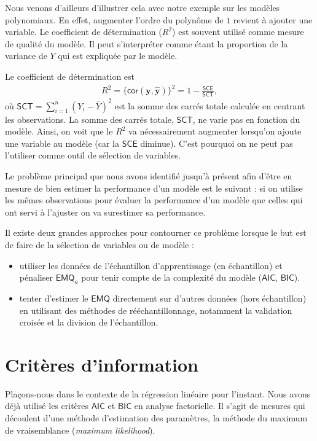 \documentclass[
]{book}
\providecommand{\tightlist}{%
  \setlength{\itemsep}{0pt}\setlength{\parskip}{0pt}}
\theoremstyle{definition}
\theoremstyle{definition}
\theoremstyle{definition}
\theoremstyle{remark}
\begin{document}
Nous venons d'ailleurs d'illustrer cela avec notre exemple sur les modèles polynomiaux. En effet, augmenter l'ordre du polynôme de \(1\) revient à ajouter une variable. Le coefficient de détermination (\(R^2\)) est souvent utilisé comme mesure de qualité du modèle. Il peut s'interpréter comme étant la proportion de la variance de \(Y\) qui est expliquée par le modèle.

Le coefficient de détermination est
\begin{align*}
R^2=\{\mathsf{cor}(\boldsymbol{y}, \widehat{\boldsymbol{y}})\}^2 = 1-\frac{\mathsf{SCE}}{\mathsf{SCT}},
\end{align*}
où \(\mathsf{SCT}=\sum_{i=1}^n (Y_i-\overline{Y})^2\) est la somme des carrés totale calculée en centrant les observations. La somme des carrés totale, \(\mathsf{SCT}\), ne varie pas en fonction du modèle.
Ainsi, on voit que le \(R^2\) va nécessairement augmenter lorsqu'on ajoute une variable au modèle (car la \(\mathsf{SCE}\) diminue). C'est pourquoi on ne peut pas l'utiliser comme outil de sélection de variables.

Le problème principal que nous avons identifié jusqu'à présent afin d'être en mesure de bien estimer la performance d'un modèle est le suivant : si on utilise les mêmes observations pour évaluer la performance d'un modèle que celles qui ont servi à l'ajuster on va surestimer sa performance.

Il existe deux grandes approches pour contourner ce problème lorsque le but est de faire de la sélection de variables ou de modèle :

\begin{itemize}
\tightlist
\item
  utiliser les données de l'échantillon d'apprentissage (en échantillon) et pénaliser \(\mathsf{EMQ}_a\) pour tenir compte de la complexité du modèle (\(\mathsf{AIC}\), \(\mathsf{BIC}\)).
\item
  tenter d'estimer le \(\mathsf{EMQ}\) directement sur d'autres données (hors échantillon) en utilisant des méthodes de rééchantillonnage, notamment la validation croisée et la division de l'échantillon.
\end{itemize}

\hypertarget{crituxe8res-dinformation}{%
\section{Critères d'information}\label{crituxe8res-dinformation}}

Plaçons-nous dans le contexte de la régression linéaire pour l'instant.
Nous avons déjà utilisé les critères \(\mathsf{AIC}\) et \(\mathsf{BIC}\) en analyse factorielle. Il s'agit de mesures qui découlent d'une méthode d'estimation des paramètres, la méthode du maximum de vraisemblance (\emph{maximum likelihood}).
\end{document}
